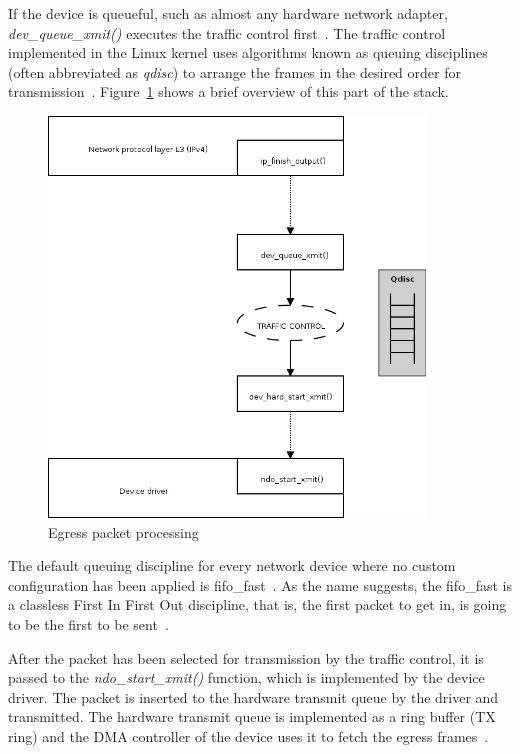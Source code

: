If the device is queueful, such as almost any hardware network adapter, {\it{dev\_queue\_xmit()}}
executes the traffic control first~\cite{understanding-internals}.
The traffic control implemented in the Linux kernel uses algorithms known as queuing disciplines
(often abbreviated as {\it{qdisc}})
to arrange the frames in the desired order for transmission~\cite{understanding-internals}.
Figure~\ref{fig:linux-egress-packet} shows a brief overview of this part of the stack.
\begin{figure}
	\centering
	\includegraphics[width=10cm,keepaspectratio]{fig/kernel-layer2-flow.png}
	\caption{Egress packet processing}
	\label{fig:linux-egress-packet}
	\bigskip
\end{figure}

The default queuing discipline for every network device where
no custom configuration has been applied is fifo\_fast~\cite{linux-kernel-networking}.
As the name suggests, the fifo\_fast is a classless First In First Out discipline,
that is, the first packet to get in, is going to be the first to be sent~\cite{tcpip-in-linux}.

After the packet has been selected for transmission by the traffic control, it is passed to the
{\it{ndo\_start\_xmit()}} function, which is implemented by the device driver.
The packet is inserted to the hardware transmit queue by the driver and transmitted.
The hardware transmit queue is implemented as a ring buffer (TX ring)
and the DMA controller of the device uses it to fetch the egress frames~\cite{kernel-source}.

